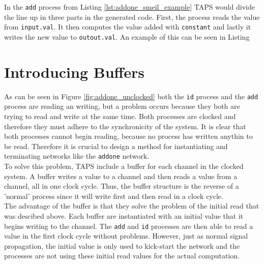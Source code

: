 In the \texttt{add} process from Listing \ref{lst:addone_smeil_example} TAPS would divide the line up in three parts in the generated \cspm{} code. First, the process reads the value from \texttt{input.val}. It then computes the value added with \texttt{constant} and lastly it writes the new value to \texttt{outout.val}. An example of this can be seen in Listing %





\section{Introducing Buffers}
As can be seen in Figure \ref{fig:addone_unclocked} both the \texttt{id} process and the \texttt{add} process are reading an writing, but a problem occurs because they both are trying to read and write at the same time. Both processes are clocked and therefore they must adhere to the synchronicity of the system. It is clear that both processes cannot begin reading, because no process has written anythin to be read. Therefore it is crucial to design a method for instantiating and terminating networks like the \texttt{addone} network.\\

To solve this problem, TAPS include a buffer for each channel in the clocked system. A buffer writes a value to a channel and then reads a value from a channel, all in one clock cycle. Thus, the buffer structure is the reverse of a 'normal' process since it will write first and then read in a clock cycle. \\

The advantage of the buffer is that they solve the problem of the initial read that was descibed above. Each buffer are instantiated with an initial value that it begins writing to the channel. The \texttt{add} and \texttt{id} processes are then able to read a value in the first clock cycle without problems. However, just as normal signal propagation, the initial value is only used to kick-start the network and the processes are not using these initial read values for the actual computation. \\


